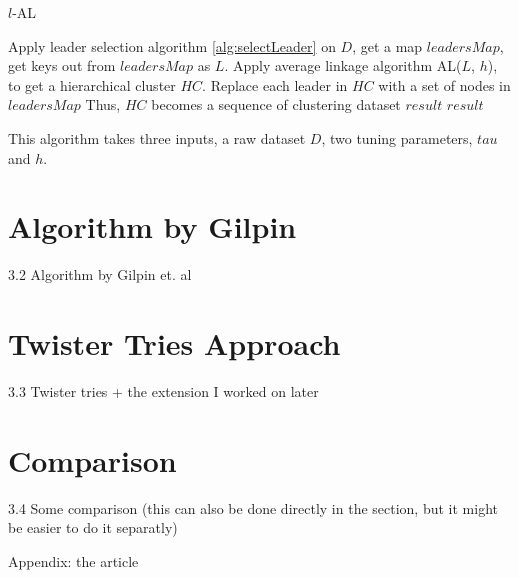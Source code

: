\documentclass[utf8,english]{gradu3}
\begin{document}
\algrenewcommand\Return{\State \algorithmicreturn{} }
\begin{algorithm}[h]
	\caption{$l$-AL}
	\label{alg:lal}
	\begin{algorithmic}[1]
		\State Apply leader selection algorithm \ref{alg:selectLeader} on $D$, get a map $leadersMap$, get keys out from $leadersMap$ as $L$.
		\State Apply average linkage algorithm AL($L$, $h$), to get a hierarchical cluster $HC$.
		\State Replace each leader in $HC$ with a set of nodes in $leadersMap$
		\State Thus, $HC$ becomes a sequence of clustering dataset $result$
		\Return $result$
		\EndProcedure
		
		This algorithm takes three inputs, a raw dataset $D$, two tuning parameters, $tau$ and $h$.
	\end{algorithmic}
\end{algorithm}




\section{Algorithm by Gilpin}
3.2 Algorithm by Gilpin et. al

\section{Twister Tries Approach}
3.3 Twister tries + the extension I worked on later

\section{Comparison}
3.4 Some comparison (this can also be done directly in the section, but it might be easier to do it separatly)

Appendix: the article
\end{document}
